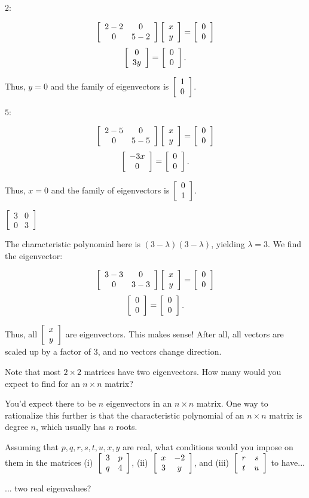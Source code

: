 \documentclass[../key.tex]{subfiles}
\begin{document}
$2$:

$$\left[\begin{array}{cc} 2-2 & 0 \\ 0 & 5-2 \end{array}\right]\left[\begin{array}{c} x \\ y \end{array}\right] = \left[\begin{array}{c} 0 \\ 0 \end{array}\right]$$
$$\left[\begin{array}{c} 0 \\ 3y \end{array}\right] = \left[\begin{array}{c} 0 \\ 0 \end{array}\right].$$

Thus, $y=0$ and the family of eigenvectors is $\left[\begin{array}{c} 1 \\ 0 \end{array}\right]$.

$5$:

$$\left[\begin{array}{cc} 2-5 & 0 \\ 0 & 5-5 \end{array}\right]\left[\begin{array}{c} x \\ y \end{array}\right] = \left[\begin{array}{c} 0 \\ 0 \end{array}\right]$$
$$\left[\begin{array}{c} -3x \\ 0 \end{array}\right] = \left[\begin{array}{c} 0 \\ 0 \end{array}\right].$$

Thus, $x=0$ and the family of eigenvectors is $\left[\begin{array}{c} 0 \\ 1 \end{array}\right]$.

\begin{inner_problem}
\item $\left[\begin{smallmatrix} 3 & 0 \\ 0 & 3 \end{smallmatrix}\right]$
\end{inner_problem}

The characteristic polynomial here is $(3-\lambda)(3-\lambda)$, yielding $\lambda = 3$. We find the eigenvector:

$$\left[\begin{array}{cc} 3-3 & 0 \\ 0 & 3-3 \end{array}\right]\left[\begin{array}{c} x \\ y \end{array}\right] = \left[\begin{array}{c} 0 \\ 0 \end{array}\right]$$
$$\left[\begin{array}{c} 0 \\ 0 \end{array}\right] = \left[\begin{array}{c} 0 \\ 0 \end{array}\right].$$

Thus, all $\left[\begin{array}{c} x \\ y \end{array}\right]$ are eigenvectors. This makes sense! After all, all vectors are scaled up by a factor of $3$, and no vectors change direction.

\begin{outer_problem}
\item Note that most $2\times 2$ matrices have two eigenvectors. How many would you expect to find for an $n\times n$ matrix?
\end{outer_problem}

You'd expect there to be $n$ eigenvectors in an $n\times n$ matrix. One way to rationalize this further is that the characteristic polynomial of an $n\times n$ matrix is degree $n$, which usually has $n$ roots.

\begin{outer_problem}
\item Assuming that $p,q,r,s,t,u,x,y$ are real, what conditions would you impose on them in the matrices (i)~$\left[\begin{array}{cc} 3 & p \\ q & 4 \end{array}\right]$, (ii)~$\left[\begin{array}{cc} x & -2 \\ 3 & y \end{array}\right]$, and (iii)~$\left[\begin{array}{cc} r & s \\ t & u \end{array}\right]$ to have...
\end{outer_problem}

\begin{inner_problem}[start=1]
\item ... two real eigenvalues?
\end{inner_problem}
\end{document}
